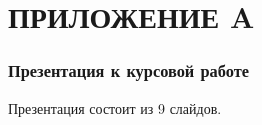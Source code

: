 \chapter*{ПРИЛОЖЕНИЕ A}

\subsection*{Презентация к курсовой работе}

Презентация состоит из 9 слайдов.
